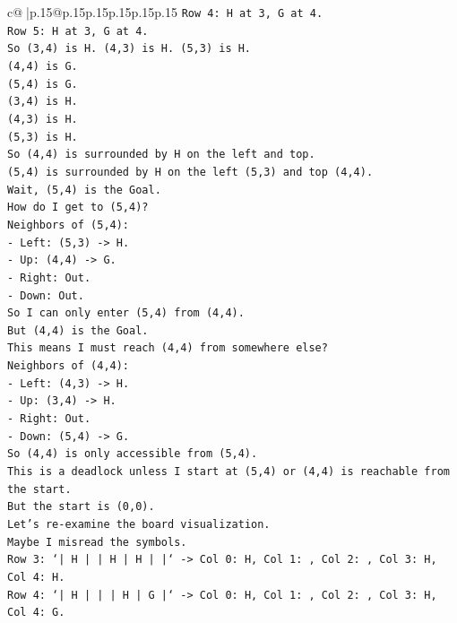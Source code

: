 \documentclass{article}
\begin{document}
{\begin{supertabular}{c@{$\;$}|p{.15\linewidth}@{}p{.15\linewidth}p{.15\linewidth}p{.15\linewidth}p{.15\linewidth}p{.15\linewidth}}
{{{\texttt{Row 4: H at 3, G at 4.} \\
\texttt{Row 5: H at 3, G at 4.} \\
\texttt{So (3,4) is H. (4,3) is H. (5,3) is H.} \\
\texttt{(4,4) is G.} \\
\texttt{(5,4) is G.} \\
\texttt{(3,4) is H.} \\
\texttt{(4,3) is H.} \\
\texttt{(5,3) is H.} \\
\texttt{So (4,4) is surrounded by H on the left and top.} \\
\texttt{(5,4) is surrounded by H on the left (5,3) and top (4,4).} \\
\texttt{Wait, (5,4) is the Goal.} \\
\texttt{How do I get to (5,4)?} \\
\texttt{Neighbors of (5,4):} \\
\texttt{{-} Left: (5,3) {-}> H.} \\
\texttt{{-} Up: (4,4) {-}> G.} \\
\texttt{{-} Right: Out.} \\
\texttt{{-} Down: Out.} \\
\texttt{So I can only enter (5,4) from (4,4).} \\
\texttt{But (4,4) is the Goal.} \\
\texttt{This means I must reach (4,4) from somewhere else?} \\
\texttt{Neighbors of (4,4):} \\
\texttt{{-} Left: (4,3) {-}> H.} \\
\texttt{{-} Up: (3,4) {-}> H.} \\
\texttt{{-} Right: Out.} \\
\texttt{{-} Down: (5,4) {-}> G.} \\
\texttt{So (4,4) is only accessible from (5,4).} \\
\texttt{This is a deadlock unless I start at (5,4) or (4,4) is reachable from the start.} \\
\texttt{But the start is (0,0).} \\
\texttt{Let's re{-}examine the board visualization.} \\
\texttt{Maybe I misread the symbols.} \\
\texttt{Row 3: `|  H  |     |  H  |  H  |     |` {-}> Col 0: H, Col 1: , Col 2: , Col 3: H, Col 4: H.} \\
\texttt{Row 4: `|  H  |     |     |  H  |  G  |` {-}> Col 0: H, Col 1: , Col 2: , Col 3: H, Col 4: G.} \\
}}}
\end{supertabular}}
\end{document}
